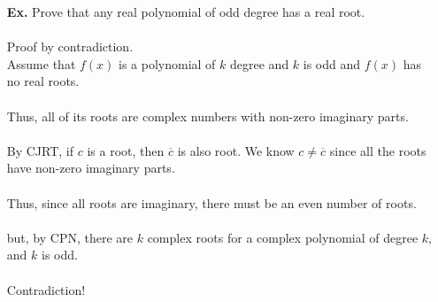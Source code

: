 \documentclass{letter}
\begin{document}
\begin{itemize}
		\item[\textbf{Ex. }] Prove that any real polynomial of odd degree has a real root.\\\\
		Proof by contradiction.\\
		Assume that $f(x)$ is a polynomial of $k$ degree and $k$ is odd and $f(x)$ has no real roots.\\\\
		Thus, all of its roots are complex numbers with non-zero imaginary parts.\\\\
		By CJRT, if $c$ is a root, then $\overline{c}$ is also root. We know $c \neq \overline{c}$ since all the roots have non-zero imaginary parts.\\\\
		Thus, since all roots are imaginary, there must be an even number of roots.\\\\
		but, by CPN, there are $k$ complex roots for a complex polynomial of degree $k$, and $k$ is odd.\\\\
		Contradiction!
	\end{itemize}
\end{document}
